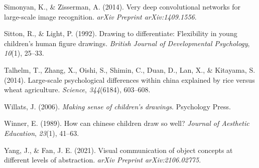 \documentclass[
  english,
  man]{apa6}
\begin{document}
\leavevmode\hypertarget{ref-simonyan2014very}{}%
Simonyan, K., \& Zisserman, A. (2014). Very deep convolutional networks for large-scale image recognition. \emph{arXiv Preprint arXiv:1409.1556}.

\leavevmode\hypertarget{ref-sitton1992drawing}{}%
Sitton, R., \& Light, P. (1992). Drawing to differentiate: Flexibility in young children's human figure drawings. \emph{British Journal of Developmental Psychology}, \emph{10}(1), 25--33.

\leavevmode\hypertarget{ref-talhelm2014large}{}%
Talhelm, T., Zhang, X., Oishi, S., Shimin, C., Duan, D., Lan, X., \& Kitayama, S. (2014). Large-scale psychological differences within china explained by rice versus wheat agriculture. \emph{Science}, \emph{344}(6184), 603--608.

\leavevmode\hypertarget{ref-willats2006making}{}%
Willats, J. (2006). \emph{Making sense of children's drawings}. Psychology Press.

\leavevmode\hypertarget{ref-winner1989can}{}%
Winner, E. (1989). How can chinese children draw so well? \emph{Journal of Aesthetic Education}, \emph{23}(1), 41--63.

\leavevmode\hypertarget{ref-yang2021visual}{}%
Yang, J., \& Fan, J. E. (2021). Visual communication of object concepts at different levels of abstraction. \emph{arXiv Preprint arXiv:2106.02775}.

\endgroup
\end{document}
